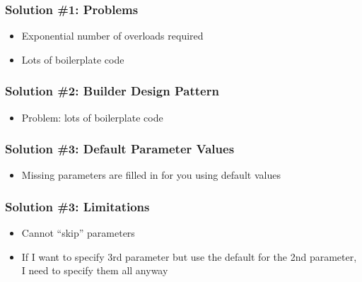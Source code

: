 \begin{frame}
  \frametitle{Solution \#1: Problems}
  \begin{center}
  \end{center}
  \begin{itemize}
    \item Exponential number of overloads required
    \item Lots of boilerplate code
  \end{itemize}
\end{frame}

\begin{frame}
  \frametitle{Solution \#2: Builder Design Pattern}
  \begin{itemize}
    \item Problem: lots of boilerplate code
  \end{itemize}
\end{frame}

\begin{frame}
  \frametitle{Solution \#3: Default Parameter Values}
  \begin{itemize}
    \item Missing parameters are filled in for you using default values
  \end{itemize}
\end{frame}

\begin{frame}
  \frametitle{Solution \#3: Limitations}
  \begin{itemize}
    \item Cannot ``skip'' parameters
    \item If I want to specify 3rd parameter but use the default for the 2nd parameter, I need
          to specify them all anyway
  \end{itemize}
\end{frame}

